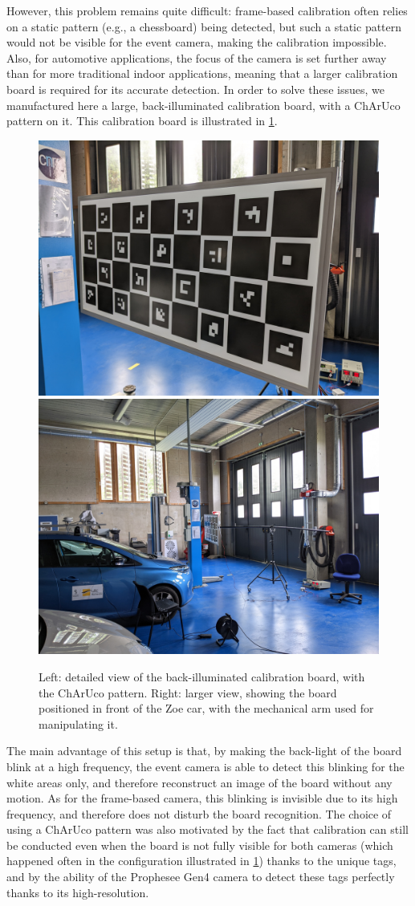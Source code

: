 However, this problem remains quite difficult: frame-based calibration often relies on a static pattern (e.g., a chessboard) being detected, but such a static pattern would not be visible for the event camera, making the calibration impossible. Also, for automotive applications, the focus of the camera is set further away than for more traditional indoor applications, meaning that a larger calibration board is required for its accurate detection. In order to solve these issues, we manufactured here a large, back-illuminated calibration board, with a ChArUco pattern on it. This calibration board is illustrated in \cref{fig:appendix:add_exp:depth_calib_board}.

\begin{figure}
  \centering
  \includegraphics[width=0.49\linewidth]{mainmatter/figures/a_additional_exp/depth_dataset/board_close.jpg}
  \includegraphics[width=0.49\linewidth]{mainmatter/figures/a_additional_exp/depth_dataset/board_large.jpg}
  \caption{Left: detailed view of the back-illuminated calibration board, with the ChArUco pattern. Right: larger view, showing the board positioned in front of the Zoe car, with the mechanical arm used for manipulating it.}\label{fig:appendix:add_exp:depth_calib_board}
\end{figure}

The main advantage of this setup is that, by making the back-light of the board blink at a high frequency, the event camera is able to detect this blinking for the white areas only, and therefore reconstruct an image of the board without any motion. As for the frame-based camera, this blinking is invisible due to its high frequency, and therefore does not disturb the board recognition. The choice of using a ChArUco pattern was also motivated by the fact that calibration can still be conducted even when the board is not fully visible for both cameras (which happened often in the configuration illustrated in \cref{fig:appendix:add_exp:depth_calib_board}) thanks to the unique tags, and by the ability of the Prophesee Gen4 camera to detect these tags perfectly thanks to its high-resolution.

